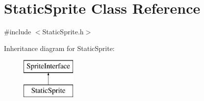\hypertarget{class_static_sprite}{}\section{Static\+Sprite Class Reference}
\label{class_static_sprite}


{\ttfamily \#include $<$Static\+Sprite.\+h$>$}

Inheritance diagram for Static\+Sprite\+:\begin{figure}[H]
\begin{center}
\leavevmode
\includegraphics[height=2.000000cm]{class_static_sprite}
\end{center}
\end{figure}
